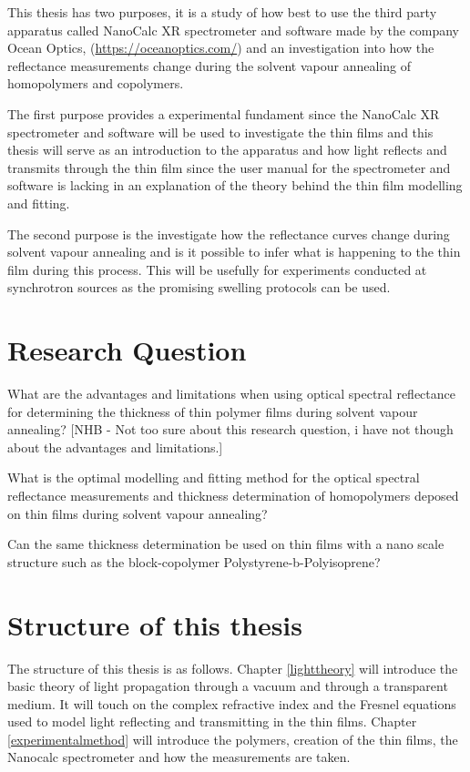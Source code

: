 \documentclass[MasterThesisMain.tex]{subfiles}
\begin{document}
This thesis has two purposes, it is a study of how best to use the third party apparatus called NanoCalc XR spectrometer and software made by the company Ocean Optics, (\url{https://oceanoptics.com/}) and an investigation into how the reflectance measurements change during the solvent vapour annealing of homopolymers and copolymers.

The first purpose provides a experimental fundament since the NanoCalc XR spectrometer and software will be used to investigate the thin films and this thesis will serve as an introduction to the apparatus and how light reflects and transmits through the thin film since the user manual for the spectrometer and software is lacking in an explanation of the theory behind the thin film modelling and fitting.

The second purpose is the investigate how the reflectance curves change during solvent vapour annealing and is it possible to infer what is happening to the thin film during this process. This will be usefully for experiments conducted at synchrotron sources as the promising swelling protocols can be used.     

\section{Research Question}
What are the advantages and limitations when using optical spectral reflectance for determining the thickness of thin polymer films during solvent vapour annealing? [NHB - Not too sure about this research question, i have not though about the advantages and limitations.] 

What is the optimal modelling and fitting method for the optical spectral reflectance measurements and thickness determination of homopolymers deposed on thin films during solvent vapour annealing?  
		
Can the same thickness determination be used on thin films with a nano scale structure such as the block-copolymer Polystyrene-b-Polyisoprene?



\section{Structure of this thesis} 
The structure of this thesis is as follows. Chapter \ref{lighttheory} will introduce the basic theory of light propagation through a vacuum and through a transparent medium. It will touch on the complex refractive index and the Fresnel equations used to model light reflecting and transmitting in the thin films. Chapter \ref{experimentalmethod} will introduce the polymers, creation of the thin films, the Nanocalc spectrometer and how the measurements are taken.          
\end{document}
